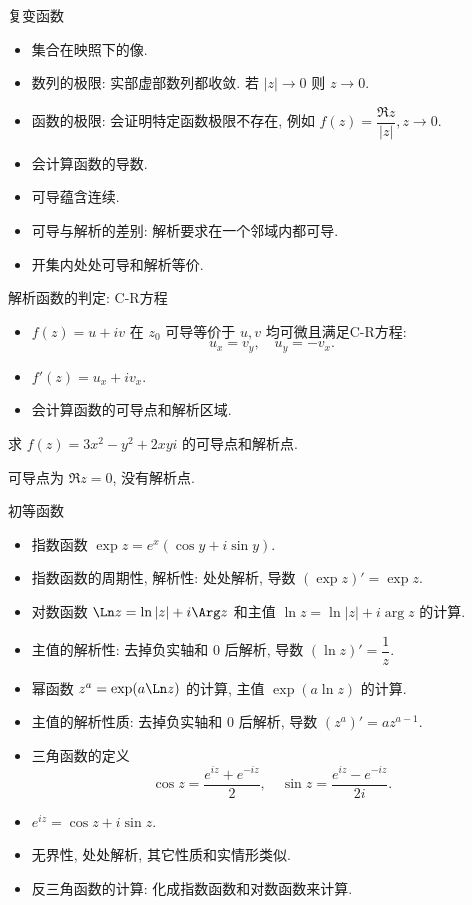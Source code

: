 \documentclass[aspectratio=169,handout]{ctexbeamer}
\begin{document}
\begin{frame}{复变函数}
	\begin{itemize}
		\item 集合在映照下的像.
		\item 数列的极限: 实部虚部数列都收敛. 若 $|z|\to0$ 则 $z\to0$.
		\item 函数的极限: 会证明特定函数极限不存在, 例如 $f(z)=\dfrac{\Re z}{|z|}, z\to 0$.
		\item 会计算函数的导数.
		\item 可导蕴含连续.
		\item 可导与解析的差别: 解析要求在一个邻域内都可导.
		\item 开集内处处可导和解析等价.
	\end{itemize}
\end{frame}


\begin{frame}{解析函数的判定: C-R方程}
	\begin{itemize}
		\item $f(z)=u+iv$ 在 $z_0$ 可导等价于 $u,v$ 均可微且满足C-R方程:
		\[u_x=v_y,\quad u_y=-v_x.\]
		\item $f'(z)=u_x+iv_x$.
		\item 会计算函数的可导点和解析区域.
	\end{itemize}
	\onslide<+->
	\begin{exercise}
		求 $f(z)=3x^2-y^2+2xyi$ 的可导点和解析点.
	\end{exercise}
	\onslide<+->
	\begin{answer}
		可导点为 $\Re z=0$, 没有解析点.
	\end{answer}
\end{frame}


\begin{frame}{初等函数}
	\begin{itemize}
		\item 指数函数 $\exp z=e^x(\cos y+i\sin y)$.
		\item 指数函数的周期性, 解析性: 处处解析, 导数 $(\exp z)'=\exp z$.
		\item 对数函数 $\Ln z=\ln|z|+i\Arg z$ 和主值 $\ln z=\ln|z|+i\arg z$ 的计算.
		\item 主值的解析性: 去掉负实轴和 $0$ 后解析, 导数 $(\ln z)'=\dfrac1z$.
		\item 幂函数 $z^a=\exp(a\Ln z)$ 的计算, 主值 $\exp(a\ln z)$ 的计算.
		\item 主值的解析性质: 去掉负实轴和 $0$ 后解析, 导数 $(z^a)'=az^{a-1}$.
		\item 三角函数的定义
		\[
			\cos z=\frac{e^{iz}+e^{-iz}}2,\quad
			\sin z=\frac{e^{iz}-e^{-iz}}{2i}.
		\]
		\item $e^{iz}=\cos z+i\sin z$.
		\item 无界性, 处处解析, 其它性质和实情形类似.
		\item 反三角函数的计算: 化成指数函数和对数函数来计算.
	\end{itemize}
\end{frame}
\end{document}
